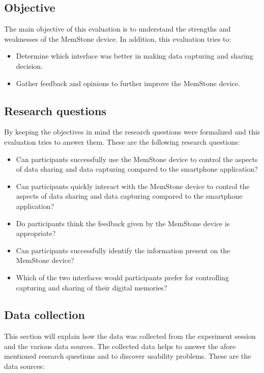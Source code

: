 \documentclass[mscthesis]{usiinfthesis}
\begin{document}
\subsection{Objective}
The main objective of this evaluation is to understand the strengths and weaknesses of the MemStone device. In addition, this evaluation tries to:
\begin{itemize}
\item Determine which interface was better in making data capturing and sharing decision. 
\item Gather feedback and opinions to further improve the MemStone device.
\end{itemize}

\subsection{Research questions}
By keeping the objectives in mind the research questions were formalized and this evaluation tries to answer them. These are the following research questions:
\begin{itemize}
 
\item Can participants successfully use the MemStone device to control the aspects of data sharing and data capturing compared to the smartphone application?

\item Can participants quickly interact with the MemStone device to control the aspects of data sharing and data capturing compared to the smartphone application? 

\item Do participants think the feedback given by the MemStone device is appropriate? 

\item Can participants successfully identify the information present on the MemStone device?

\item Which of the two interfaces would participants prefer for controlling capturing and sharing of their digital memories?

\end{itemize}

\subsection{Data collection}

This section will explain how the data was collected from the experiment session and the various data sources. The collected data helps to answer the afore mentioned research questions and to discover usability problems. These are the data sources:
\newline
\end{document}
